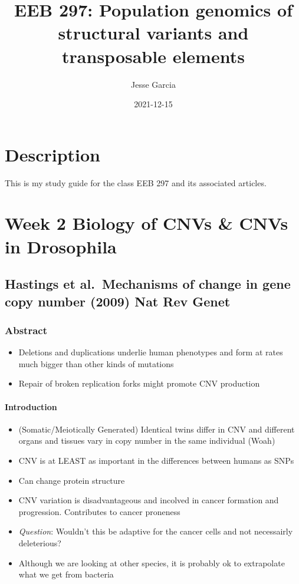 \documentclass[]{book}
\title{EEB 297: Population genomics of structural variants and transposable elements}
\author{Jesse Garcia}
\date{2021-12-15}
\providecommand{\tightlist}{%
  \setlength{\itemsep}{0pt}\setlength{\parskip}{0pt}}
\begin{document}
\maketitle

{
\setcounter{tocdepth}{1}
\tableofcontents
}
\hypertarget{description}{%
\chapter{Description}\label{description}}

This is my study guide for the class EEB 297 and its associated articles.

\hypertarget{week2}{%
\chapter{Week 2 Biology of CNVs \& CNVs in Drosophila}\label{week2}}

\hypertarget{hastings-et-al.mechanisms-of-change-in-gene-copy-number-2009-nat-rev-genet}{%
\section{Hastings et al.~Mechanisms of change in gene copy number (2009) Nat Rev Genet}\label{hastings-et-al.mechanisms-of-change-in-gene-copy-number-2009-nat-rev-genet}}

\hypertarget{abstract}{%
\subsection{Abstract}\label{abstract}}

\begin{itemize}
\tightlist
\item
  Deletions and duplications underlie human phenotypes and form at rates much bigger than other kinds of mutations
\item
  Repair of broken replication forks might promote CNV production
\end{itemize}

\hypertarget{introduction}{%
\subsubsection{Introduction}\label{introduction}}

\begin{itemize}
\tightlist
\item
  (Somatic/Meiotically Generated) Identical twins differ in CNV and different organs and tissues vary in copy number in the same individual (Woah)
\item
  CNV is at LEAST as important in the differences between humans as SNPs
\item
  Can change protein structure
\item
  CNV variation is disadvantageous and incolved in cancer formation and progression. Contributes to cancer proneness
\item
  \emph{Question}: Wouldn't this be adaptive for the cancer cells and not necessairly deleterious?
\item
  Although we are looking at other species, it is probably ok to extrapolate what we get from bacteria
\end{itemize}
\end{document}

